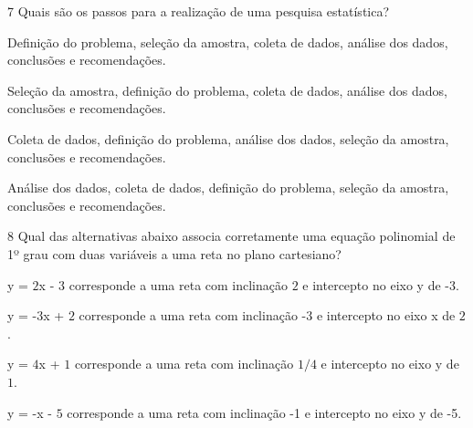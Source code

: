 \num{7}  Quais são os passos para a realização de uma pesquisa estatística?

\begin{escolha}
\item Definição do problema, seleção da amostra, coleta de dados, análise
dos dados, conclusões e recomendações.
\item Seleção da amostra, definição do problema, coleta de dados, análise
dos dados, conclusões e recomendações.
\item Coleta de dados, definição do problema, análise dos dados, seleção da
amostra, conclusões e recomendações.
\item Análise dos dados, coleta de dados, definição do problema, seleção da
amostra, conclusões e recomendações.
\end{escolha}



\num{8}  Qual das alternativas abaixo associa corretamente uma equação
polinomial de 1º grau com duas variáveis a uma reta no plano cartesiano?

\begin{escolha}
\item y = $2$x - $3$ corresponde a uma reta com inclinação $2$ e intercepto no
eixo y de -3.
\item y = -3x + $2$ corresponde a uma reta com inclinação -3 e intercepto no
eixo x de $2$.
\item y = $4$x + $1$ corresponde a uma reta com inclinação $1/4$ e intercepto no
eixo y de $1$.
\item y = -x - $5$ corresponde a uma reta com inclinação -1 e intercepto no
eixo y de -5.
\end{escolha}


